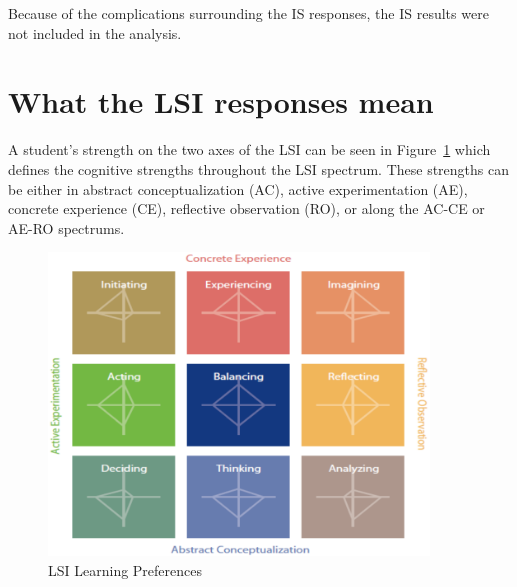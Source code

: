 Because of the complications surrounding the IS responses, the IS results were not included in the analysis.

\section{What the LSI responses mean}
A student's strength on the two axes of the LSI can be seen in Figure~\ref{fig:learning-preferences} which defines the cognitive strengths throughout the LSI spectrum. These strengths can be either in abstract conceptualization (AC), active experimentation (AE), concrete experience (CE), reflective observation (RO), or along the AC-CE or AE-RO spectrums.

\begin{figure}
  \centering
  \includegraphics[width=0.9\textwidth]{figures/chapter4/learning-preferences.png}
  \caption{LSI Learning Preferences}
  \label{fig:learning-preferences}
\end{figure}

